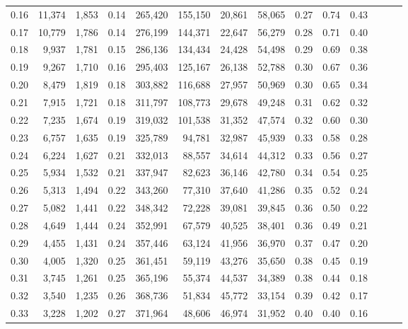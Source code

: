 \begin{tabular}{rrrrrrrrrrrrrr}
0.16 &  11,374 &  1,853 &  0.14 &  265,420 &  155,150 &  20,861 &  58,065 &  0.27 &  0.74 &      0.43 \\
0.17 &  10,779 &  1,786 &  0.14 &  276,199 &  144,371 &  22,647 &  56,279 &  0.28 &  0.71 &      0.40 \\
0.18 &   9,937 &  1,781 &  0.15 &  286,136 &  134,434 &  24,428 &  54,498 &  0.29 &  0.69 &      0.38 \\
0.19 &   9,267 &  1,710 &  0.16 &  295,403 &  125,167 &  26,138 &  52,788 &  0.30 &  0.67 &      0.36 \\
0.20 &   8,479 &  1,819 &  0.18 &  303,882 &  116,688 &  27,957 &  50,969 &  0.30 &  0.65 &      0.34 \\
0.21 &   7,915 &  1,721 &  0.18 &  311,797 &  108,773 &  29,678 &  49,248 &  0.31 &  0.62 &      0.32 \\
0.22 &   7,235 &  1,674 &  0.19 &  319,032 &  101,538 &  31,352 &  47,574 &  0.32 &  0.60 &      0.30 \\
0.23 &   6,757 &  1,635 &  0.19 &  325,789 &   94,781 &  32,987 &  45,939 &  0.33 &  0.58 &      0.28 \\
0.24 &   6,224 &  1,627 &  0.21 &  332,013 &   88,557 &  34,614 &  44,312 &  0.33 &  0.56 &      0.27 \\
0.25 &   5,934 &  1,532 &  0.21 &  337,947 &   82,623 &  36,146 &  42,780 &  0.34 &  0.54 &      0.25 \\
0.26 &   5,313 &  1,494 &  0.22 &  343,260 &   77,310 &  37,640 &  41,286 &  0.35 &  0.52 &      0.24 \\
0.27 &   5,082 &  1,441 &  0.22 &  348,342 &   72,228 &  39,081 &  39,845 &  0.36 &  0.50 &      0.22 \\
0.28 &   4,649 &  1,444 &  0.24 &  352,991 &   67,579 &  40,525 &  38,401 &  0.36 &  0.49 &      0.21 \\
0.29 &   4,455 &  1,431 &  0.24 &  357,446 &   63,124 &  41,956 &  36,970 &  0.37 &  0.47 &      0.20 \\
0.30 &   4,005 &  1,320 &  0.25 &  361,451 &   59,119 &  43,276 &  35,650 &  0.38 &  0.45 &      0.19 \\
0.31 &   3,745 &  1,261 &  0.25 &  365,196 &   55,374 &  44,537 &  34,389 &  0.38 &  0.44 &      0.18 \\
0.32 &   3,540 &  1,235 &  0.26 &  368,736 &   51,834 &  45,772 &  33,154 &  0.39 &  0.42 &      0.17 \\
0.33 &   3,228 &  1,202 &  0.27 &  371,964 &   48,606 &  46,974 &  31,952 &  0.40 &  0.40 &      0.16 \\

\end{tabular}
